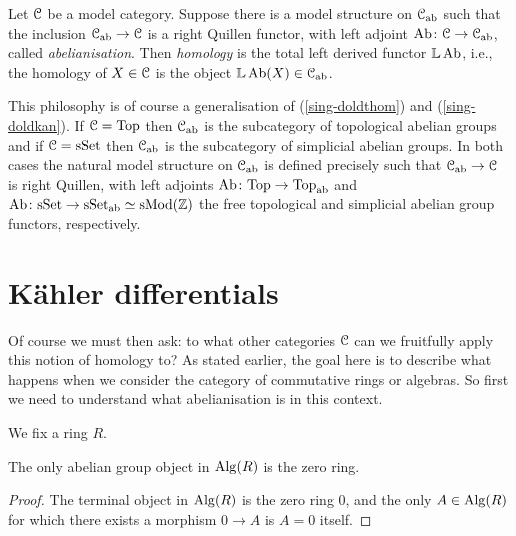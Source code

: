\renewcommand{\L}{\mathbb{L}}

\begin{definition}
  \label{derivedab}
  Let $\mathcal{C}$ be a model category. Suppose there is a model structure on
  $\mathcal{C}_{\mathrm{ab}}$ such that the inclusion $\mathcal{C}_{\mathrm{ab}} \to \mathcal{C}$ is a right
  Quillen functor, with left adjoint $\operatorname{Ab} \colon \mathcal{C} \to \mathcal{C}_{\mathrm{ab}}$, called
  \emph{abelianisation}. Then \emph{homology} is the total left
  derived functor $\L \Ab$, i.e., the homology of $X \in \mathcal{C}$ is the
  object $\L \Ab(X) \in \C_\ab$.
\end{definition}

\begin{examples}
  This philosophy is of course a generalisation of
  (\ref{sing-doldthom}) and (\ref{sing-doldkan}). If $\mathcal{C} = \mathrm{Top}$ then
  $\mathcal{C}_{\mathrm{ab}}$ is the subcategory of topological abelian groups and if $\mathcal{C}
  = \mathrm{s}\mathrm{Set}$ then $\mathcal{C}_{\mathrm{ab}}$ is the subcategory of simplicial abelian
  groups. In both cases the natural model structure on $\mathcal{C}_{\mathrm{ab}}$ is
  defined precisely such that $\mathcal{C}_{\mathrm{ab}} \to \mathcal{C}$ is right Quillen, with
  left adjoints $\operatorname{Ab} \colon \mathrm{Top} \to \mathrm{Top}_{\mathrm{ab}}$ and $\operatorname{Ab} \colon \mathrm{s}\mathrm{Set} \to
  \mathrm{s}\mathrm{Set}_{\mathrm{ab}} \simeq \mathrm{s}\mathrm{Mod}(\mathbb{Z})$ the free topological and simplicial
  abelian group functors, respectively.
\end{examples}

\section{K\"ahler differentials}
\label{abelianalgebra}

Of course we must then ask: to what other categories $\mathcal{C}$ can we
fruitfully apply this notion of homology to? As stated earlier, the
goal here is to describe what happens when we consider the category of
commutative rings or algebras. So first we need to understand what
abelianisation is in this context.

\begin{notation}
  We fix a ring $R$.
\end{notation}

\begin{proposition}
  The only abelian group object in $\mathrm{Alg}(R)$ is the zero ring.
\end{proposition}

\begin{proof}
  The terminal object in $\mathrm{Alg}(R)$ is the zero ring $0$, and the only
  $A \in \mathrm{Alg}(R)$ for which there exists a morphism $0 \to A$ is $A =
  0$ itself.
\end{proof}

